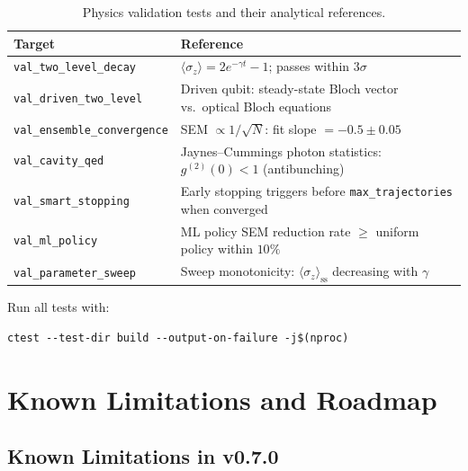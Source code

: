 \documentclass[11pt,a4paper,twoside]{book}
\newcommand{\code}[1]{\texttt{\small#1}}
\theoremstyle{definition}
\theoremstyle{remark}
\begin{document}
\begin{table}[H]
\centering
\caption{Physics validation tests and their analytical references.}
\label{tab:validation-tests}
\begin{tabularx}{\linewidth}{L{42mm}X}
\toprule
\textbf{Target} & \textbf{Reference} \\
\midrule
\code{val\_two\_level\_decay}
  & $\langle\sigma_z\rangle = 2e^{-\gamma t}-1$; passes within $3\sigma$ \\
\code{val\_driven\_two\_level}
  & Driven qubit: steady-state Bloch vector vs.\ optical Bloch equations \\
\code{val\_ensemble\_convergence}
  & SEM $\propto 1/\sqrt{N}$: fit slope $= -0.5 \pm 0.05$ \\
\code{val\_cavity\_qed}
  & Jaynes--Cummings photon statistics: $g^{(2)}(0) < 1$ (antibunching) \\
\code{val\_smart\_stopping}
  & Early stopping triggers before \code{max\_trajectories} when converged \\
\code{val\_ml\_policy}
  & ML policy SEM reduction rate $\geq$ uniform policy within $10\%$ \\
\code{val\_parameter\_sweep}
  & Sweep monotonicity: $\langle\sigma_z\rangle_{\mathrm{ss}}$ decreasing with $\gamma$ \\
\bottomrule
\end{tabularx}
\end{table}

Run all tests with:
\begin{verbatim}
ctest --test-dir build --output-on-failure -j$(nproc)
\end{verbatim}

\chapter{Known Limitations and Roadmap}
\label{chap:limitations}

\section{Known Limitations in v0.7.0}
\label{sec:known-limitations}
\end{document}
